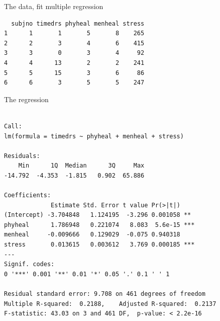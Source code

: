 \begin{frame}[fragile]{The data, fit multiple regression}

 
\begin{knitrout}
\color{fgcolor}\begin{kframe}
\begin{alltt}
\hlkwb{=}\hlstd{(}\hlstd{,}
\end{alltt}
\begin{verbatim}
  subjno timedrs phyheal menheal stress
1      1       1       5       8    265
2      2       3       4       6    415
3      3       0       3       4     92
4      4      13       2       2    241
5      5      15       3       6     86
6      6       3       5       5    247
\end{verbatim}
\begin{alltt}
\hlkwb{=}\hlopt{~}\hlopt{+}\hlopt{+}
\end{alltt}
\end{kframe}
\end{knitrout}
  


\end{frame}

\begin{frame}[fragile]{The regression}

{\scriptsize
 
\begin{knitrout}
\color{fgcolor}\begin{kframe}
\begin{alltt}
\end{alltt}
\begin{verbatim}

Call:
lm(formula = timedrs ~ phyheal + menheal + stress)

Residuals:
    Min      1Q  Median      3Q     Max 
-14.792  -4.353  -1.815   0.902  65.886 

Coefficients:
             Estimate Std. Error t value Pr(>|t|)    
(Intercept) -3.704848   1.124195  -3.296 0.001058 ** 
phyheal      1.786948   0.221074   8.083  5.6e-15 ***
menheal     -0.009666   0.129029  -0.075 0.940318    
stress       0.013615   0.003612   3.769 0.000185 ***
---
Signif. codes:  
0 '***' 0.001 '**' 0.01 '*' 0.05 '.' 0.1 ' ' 1

Residual standard error: 9.708 on 461 degrees of freedom
Multiple R-squared:  0.2188,	Adjusted R-squared:  0.2137 
F-statistic: 43.03 on 3 and 461 DF,  p-value: < 2.2e-16
\end{verbatim}
\end{kframe}
\end{knitrout}
}  
  

\end{frame}


